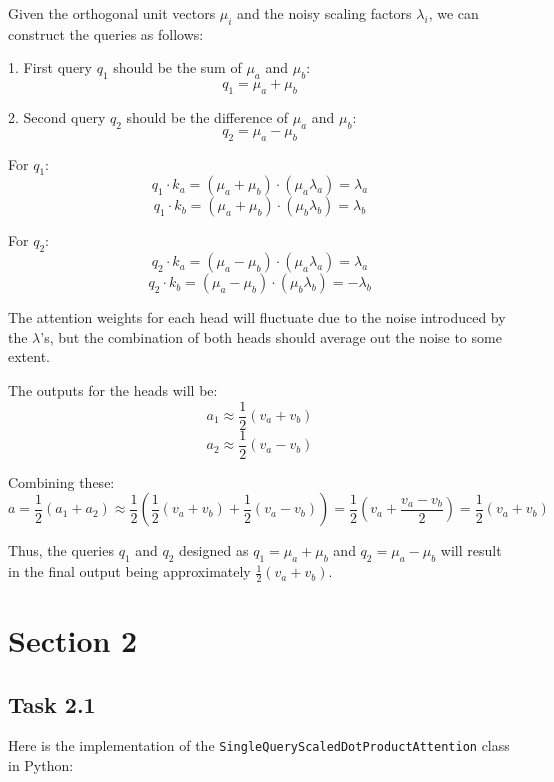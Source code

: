 \documentclass{article}
\begin{document}
Given the orthogonal unit vectors \( \mu_i \) and the noisy scaling factors \( \lambda_i \), we can construct the queries as follows:

1. First query \( q_1 \) should be the sum of \( \mu_a \) and \( \mu_b \):
   \[
   q_1 = \mu_a + \mu_b
   \]

2. Second query \( q_2 \) should be the difference of \( \mu_a \) and \( \mu_b \):
   \[
   q_2 = \mu_a - \mu_b
   \]

For \( q_1 \):
   \[
   q_1 \cdot k_a = (\mu_a + \mu_b) \cdot (\mu_a \lambda_a) = \lambda_a
   \]
   \[
   q_1 \cdot k_b = (\mu_a + \mu_b) \cdot (\mu_b \lambda_b) = \lambda_b
   \]

For \( q_2 \):
   \[
   q_2 \cdot k_a = (\mu_a - \mu_b) \cdot (\mu_a \lambda_a) = \lambda_a
   \]
   \[
   q_2 \cdot k_b = (\mu_a - \mu_b) \cdot (\mu_b \lambda_b) = -\lambda_b
   \]

The attention weights for each head will fluctuate due to the noise introduced by the \( \lambda \)'s, but the combination of both heads should average out the noise to some extent.

The outputs for the heads will be:
   \[
   a_1 \approx \frac{1}{2}(v_a + v_b)
   \]
   \[
   a_2 \approx \frac{1}{2}(v_a - v_b)
   \]

Combining these:
   \[
   a = \frac{1}{2}(a_1 + a_2) \approx \frac{1}{2} \left( \frac{1}{2}(v_a + v_b) + \frac{1}{2}(v_a - v_b) \right) = \frac{1}{2} \left( v_a + \frac{v_a - v_b}{2} \right) = \frac{1}{2}(v_a + v_b)
   \]

Thus, the queries \( q_1 \) and \( q_2 \) designed as \( q_1 = \mu_a + \mu_b \) and \( q_2 = \mu_a - \mu_b \) will result in the final output being approximately \( \frac{1}{2}(v_a + v_b) \).

\pagebreak
\section{Section 2}
\subsection{Task 2.1}
Here is the implementation of the \texttt{SingleQueryScaledDotProductAttention} class in Python:
\end{document}
